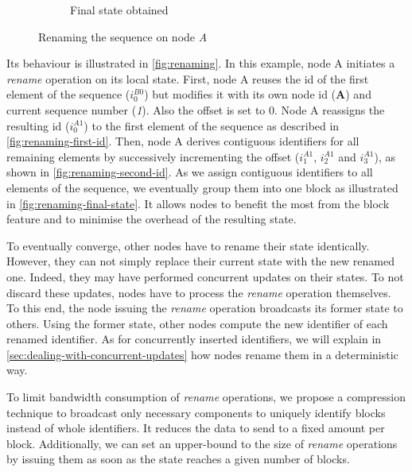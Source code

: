 \documentclass[sigplan,10pt,authorversion]{acmart}
\newcommand{\trm}[1]{\mathit{#1}}
\newcommand{\id}[3]{$\trm{#1}^{\trm{#2}}_{\trm{#3}}$}
\begin{document}
\begin{figure}[ht!]
\begin{subfigure}{\columnwidth}
        \caption{Final state obtained}
        \label{fig:renaming-final-state}
    \end{subfigure}
    \caption{Renaming the sequence on node \emph{A}}
    \label{fig:renaming}
\end{figure}

Its behaviour is illustrated in \autoref{fig:renaming}.
In this example, node A initiates a \emph{rename} operation on its local state.
First, node A reuses the id of the first element of the sequence (\id{i}{B0}{0}) but modifies it with its own node id (\textbf{A}) and current sequence number (\emph{1}).
Also the offset is set to 0.
Node A reassigns the resulting id (\id{i}{A1}{0}) to the first element of the sequence as described in \autoref{fig:renaming-first-id}.
Then, node A derives contiguous identifiers for all remaining elements by successively incrementing the offset (\id{i}{A1}{1}, \id{i}{A1}{2} and \id{i}{A1}{3}), as shown in \autoref{fig:renaming-second-id}.
As we assign contiguous identifiers to all elements of the sequence, we eventually group them into one block as illustrated in \autoref{fig:renaming-final-state}.
It allows nodes to benefit the most from the block feature and to minimise the overhead of the resulting state.

To eventually converge, other nodes have to rename their state identically.
However, they can not simply replace their current state with the new renamed one.
Indeed, they may have performed concurrent updates on their states.
To not discard these updates, nodes have to process the \emph{rename} operation themselves.
To this end, the node issuing the \emph{rename} operation broadcasts its former state to others.
Using the former state, other nodes compute the new identifier of each renamed identifier.
As for concurrently inserted identifiers, we will explain in \autoref{sec:dealing-with-concurrent-updates} how nodes rename them in a deterministic way.

To limit bandwidth consumption of \emph{rename} operations, we propose a compression technique to broadcast only necessary components to uniquely identify blocks instead of whole identifiers.
It reduces the data to send to a fixed amount per block.
Additionally, we can set an upper-bound to the size of \emph{rename} operations by issuing them as soon as the state reaches a given number of blocks.
\end{document}
